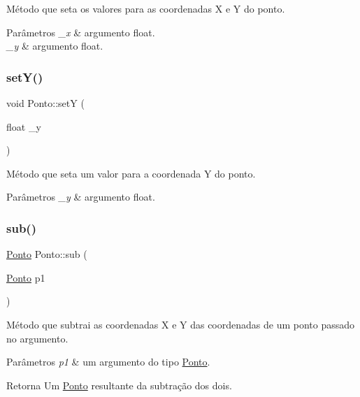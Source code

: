Método que seta os valores para as coordenadas X e Y do ponto. 


\begin{DoxyParams}{Parâmetros}
{\em \+\_\+x} & argumento float. \\
\hline
{\em \+\_\+y} & argumento float. \\
\hline
\end{DoxyParams}
\mbox{\label{classPonto_a2d9e5b9fade9d3f3f21122a2dc2f5e11}} 
\subsubsection{\texorpdfstring{set\+Y()}{setY()}}
{\footnotesize\ttfamily void Ponto\+::setY (\begin{DoxyParamCaption}\item[{float}]{\+\_\+y }\end{DoxyParamCaption})}



Método que seta um valor para a coordenada Y do ponto. 


\begin{DoxyParams}{Parâmetros}
{\em \+\_\+y} & argumento float. \\
\hline
\end{DoxyParams}
\mbox{\label{classPonto_a8404fcad0fca2ce768ab9e1550f5d3a0}} 
\subsubsection{\texorpdfstring{sub()}{sub()}}
{\footnotesize\ttfamily \hyperlink{classPonto}{Ponto} Ponto\+::sub (\begin{DoxyParamCaption}\item[{\hyperlink{classPonto}{Ponto}}]{p1 }\end{DoxyParamCaption})}



Método que subtrai as coordenadas X e Y das coordenadas de um ponto passado no argumento. 


\begin{DoxyParams}{Parâmetros}
{\em p1} & um argumento do tipo \hyperlink{classPonto}{Ponto}. \\
\hline
\end{DoxyParams}
\begin{DoxyReturn}{Retorna}
Um \hyperlink{classPonto}{Ponto} resultante da subtração dos dois. 
\end{DoxyReturn}
\mbox{\label{classPonto_a96a4395204ec010814e67d20705e630f}} 
